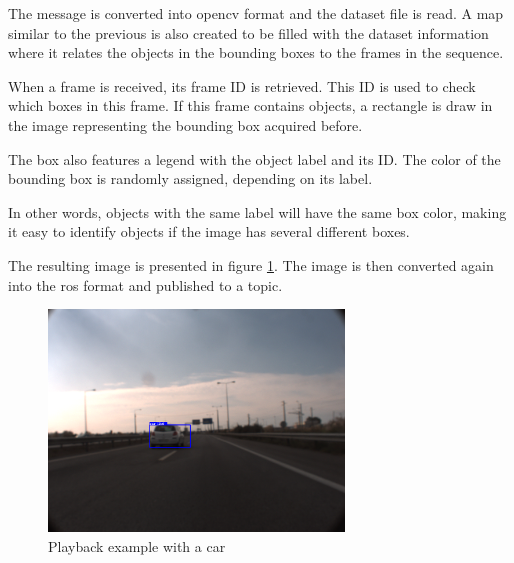 The message is converted into \gls{opencv} format and the dataset file is read. A map similar to the previous is also created to be filled with the dataset information where it relates the objects in the bounding boxes to the frames in the sequence. 

When a frame is received, its frame ID is retrieved. This ID is used to check which boxes in this frame. If this frame contains objects, a rectangle is draw in the image representing the bounding box acquired before. 

The box also features a legend with the object label and its ID. The color of the bounding box is randomly assigned, depending on its label. 

In other words, objects with the same label will have the same box color, making it easy to identify objects if the image has several different boxes. 

The resulting image is presented in figure \ref{fig:playback}. The image is then converted again into the \gls{ros} format and published to a topic.

\begin{figure}[htp]
	
	\centering
	\includegraphics[width=0.7\textwidth]{caplabel/imgs/playback.png}
	
	\caption{Playback example with a car}
	\label{fig:playback}
	
\end{figure}